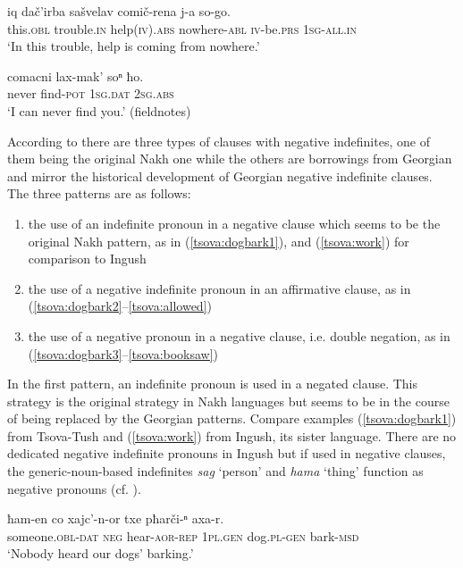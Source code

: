 \documentclass[output=paper,%
colorlinks,citecolor=brown,
showindex
]{langscibook}
\begin{document}
\ea	\label{tsova:fromnowhere}
\gll 	iq dač'irba sašvelav comič-rena j-a so-go.\\  
	this.\textsc{obl} trouble.\textsc{in} help\textsc{(iv).abs} nowhere-\textsc{abl} \textsc{iv}-be.\textsc{prs} \textsc{1sg-all.in}\\
\glt `In this trouble, help is coming from nowhere.' \citep[272]{BertlaniEtAl2013} 
\z

\ea	\label{tsova:cantfind}
\gll 	comacni lax-mak' soⁿ ħo.\\  
	never find-\textsc{pot} \textsc{1sg.dat} \textsc{2sg.abs}\\
\glt `I can never find you.' (fieldnotes)
\z

According to \citet[202ff]{Mikeladze2011} there are three types of clauses with negative indefinites, one of them being the original Nakh one while the others are borrowings from Georgian and mirror the historical development of Georgian negative indefinite clauses. The three patterns are as follows:

\begin{enumerate}
    \item the use of an indefinite pronoun in a negative clause which seems to be the original Nakh pattern, as in (\ref{tsova:dogbark1}), and (\ref{tsova:work}) for comparison to Ingush 
    \item the use of a negative indefinite pronoun in an affirmative clause, as in (\ref{tsova:dogbark2}--\ref{tsova:allowed})
    \item the use of a negative pronoun in a negative clause, i.e. double negation, as in (\ref{tsova:dogbark3}--\ref{tsova:booksaw}) 
\end{enumerate}

In the first pattern, an indefinite pronoun is used in a negated clause. This strategy is the original strategy in Nakh languages but seems to be in the course of being replaced by the Georgian patterns. Compare examples (\ref{tsova:dogbark1}) from Tsova-Tush and (\ref{tsova:work}) from Ingush, its sister language. There are no dedicated negative indefinite pronouns in Ingush but if used in negative clauses, the generic-noun-based indefinites \textit{sag} `person' and \textit{hama} `thing' function as negative pronouns (cf. \citealt[696]{Nichols2011}). 

\ea	\label{tsova:dogbark1}
\gll 	ħam-en	co	xajc’-n-or	txe	pħarči-ⁿ	axa-r.\\  
	someone.\textsc{obl-dat} \textsc{neg} hear-\textsc{aor-rep} \textsc{1pl.gen} dog.\textsc{pl-gen} bark-\textsc{msd}\\
\glt `Nobody heard our dogs’ barking.' \citep[198]{Mikeladze2011} 
\z
\end{document}
